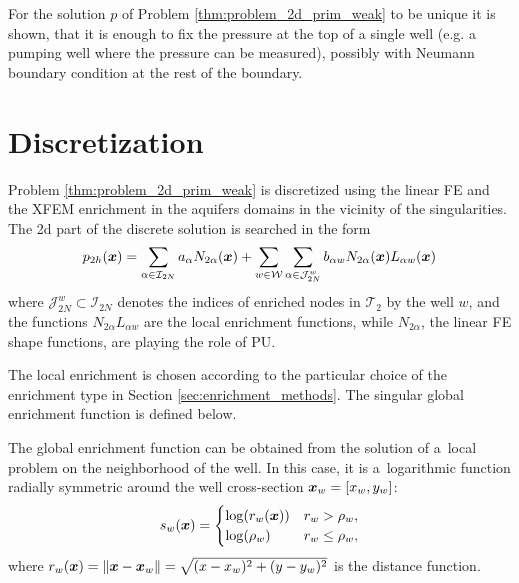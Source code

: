 For the solution $p$ of Problem \ref{thm:problem_2d_prim_weak} to be unique it is shown,
that it is enough to fix the pressure at the top of a single well (e.g. a pumping well
where the pressure can be measured), possibly with Neumann boundary condition
at the rest of the boundary.


\section{Discretization}
\label{sec:prim_discretization}

Problem \ref{thm:problem_2d_prim_weak} is discretized using the linear FE and the XFEM enrichment
in the aquifers domains in the vicinity of the singularities.
The 2d part of the discrete solution is searched in the form
\begin{equation} \label{eqn:prim_xfem_standard_form}
  p_{2h}(\mathbf{\boldsymbol{x}}) = \sum_{\alpha\in\mathcal{I}_{2N}}a_\alpha N_{2\alpha}(\mathbf{\boldsymbol{x}})
    + \sum_{w\in\mathcal{W}} \sum_{\alpha\in\mathcal{J}^w_{2N}} b_{\alpha w} N_{2\alpha}(\mathbf{\boldsymbol{x}}) L_{\alpha w}(\mathbf{\boldsymbol{x}})
\end{equation}
where $\mathcal{J}^w_{2N}\subset\mathcal{I}_{2N}$ denotes the indices of enriched nodes in $\mathcal{T}_2$ 
by the well $w$, and the functions $N_{2\alpha}L_{\alpha w}$ are the local enrichment functions,
while $N_{2\alpha}$, the linear FE shape functions, are playing the role of PU.

The local enrichment is chosen according to the particular choice of the enrichment type in Section \ref{sec:enrichment_methods}.
The singular global enrichment function is defined below.

 The global enrichment function can be obtained from the solution of a~local problem on the neighborhood of the well.
 In this case, it is a~logarithmic function radially symmetric around the well cross-section $\mathbf{\boldsymbol{x}}_w=[x_w, y_w]$:
\begin{equation} \label{eqn:enrich_func}
s_w(\mathbf{\boldsymbol{x}}) = 
  \begin{cases}
  \log(r_w(\mathbf{\boldsymbol{x}})) & r_w > \rho_w,\\
  \log(\rho_w) & r_w \le \rho_w,\\
  \end{cases}
\end{equation}
where $r_w(\mathbf{\boldsymbol{x}}) = \|\mathbf{\boldsymbol{x}} - \mathbf{\boldsymbol{x}}_w\|= \sqrt{(x-x_w)^2+(y-y_w)^2}$ is the distance function.

